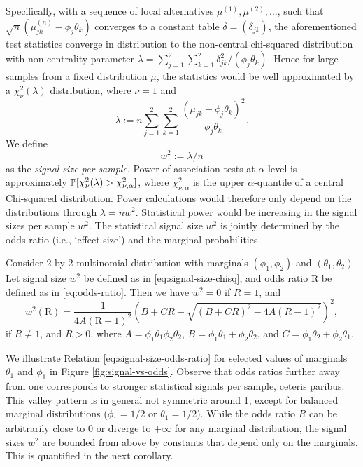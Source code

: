 Specifically, with a sequence of local alternatives $\mu^{(1)}, \mu^{(2)}, \ldots$, such that $\sqrt{n}(\mu^{(n)}_{jk} - \phi_j\theta_k)$ converges to a constant table $\delta = (\delta_{jk})$, the aforementioned test statistics converge in distribution to the non-central chi-squared distribution with non-centrality parameter 
$\lambda = \sum_{j=1}^2 \sum_{k=1}^2 {\delta_{jk}^2}/{(\phi_j\theta_k)}$.
Hence for large samples from a fixed distribution $\mu$, the statistics would be well approximated by a $\chi^2_\nu(\lambda)$ distribution, where $\nu=1$ and
\begin{equation} 
\lambda := n\sum_{j=1}^2 \sum_{k=1}^2 \frac{(\mu_{jk} - \phi_j\theta_k)^2}{\phi_j\theta_k}.
\end{equation}
We define 
\begin{equation} \label{eq:signal-size-chisq}
    w^2:=\lambda/n
\end{equation} 
as the \emph{signal size per sample}.
Power of association tests at $\alpha$ level is approximately $\P[\chi^2_{\nu}(\lambda)>\chi^2_{\nu,\alpha}]$, where $\chi^2_{\nu,\alpha}$ is the upper $\alpha$-quantile of a central Chi-squared distribution.
Power calculations would therefore only depend on the distributions through $\lambda=nw^2$. Statistical power would be increasing in the signal sizes per sample $w^2$.
The statistical signal size $w^2$ is jointly determined by the odds ratio (i.e., `effect size') and the marginal probabilities.

\begin{proposition} \label{prop:signal-size-odds-ratio}
Consider 2-by-2 multinomial distribution with marginals $(\phi_1, \phi_2)$ and $(\theta_1, \theta_2)$.
Let signal size $w^2$ be defined as in \eqref{eq:signal-size-chisq}, and odds ratio $\text{R}$ be defined as in \eqref{eq:odds-ratio}. 
Then we have $w^2 = 0$ if $R=1$, and
\begin{equation} \label{eq:signal-size-odds-ratio}
    w^2(\text{R}) =
    \frac{1}{4A(\text{R}-1)^2}\left(B+CR-\sqrt{(B+CR)^2-4A(R-1)^2}\right)^2,
\end{equation}
if $R\neq1$, and $R>0$, 
where $A = \phi_1\theta_1\phi_2\theta_2$, $B = \phi_1\theta_1+\phi_2\theta_2$, and $C = \phi_1\theta_2+\phi_2\theta_1$.
\end{proposition}

We illustrate Relation \eqref{eq:signal-size-odds-ratio} for selected values of marginals $\theta_1$ and $\phi_1$ in Figure \ref{fig:signal-vs-odds}.
Observe that odds ratios further away from one corresponds to stronger statistical signals per sample, ceteris paribus.
This valley pattern is in general not symmetric around 1, except for balanced marginal distributions ($\phi_1=1/2$ or $\theta_1=1/2$).
While the odds ratio $R$ can be arbitrarily close to 0 or diverge to $+\infty$ for any marginal distribution, the signal sizes $w^2$ are bounded from above by constants that depend only on the marginals.
This is quantified in the next corollary.

